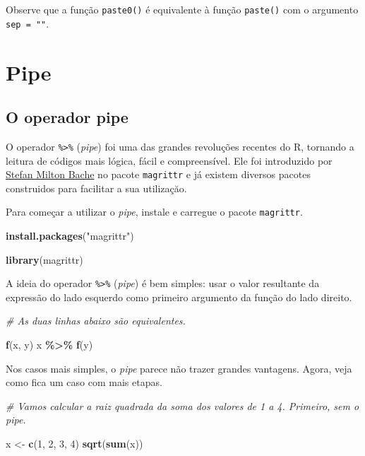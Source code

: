 \documentclass[
]{book}
\newenvironment{Shaded}{\begin{snugshade}}{\end{snugshade}}
\newcommand{\CommentTok}[1]{\textcolor[rgb]{0.56,0.35,0.01}{\textit{#1}}}
\newcommand{\DecValTok}[1]{\textcolor[rgb]{0.00,0.00,0.81}{#1}}
\newcommand{\KeywordTok}[1]{\textcolor[rgb]{0.13,0.29,0.53}{\textbf{#1}}}
\newcommand{\NormalTok}[1]{#1}
\newcommand{\OperatorTok}[1]{\textcolor[rgb]{0.81,0.36,0.00}{\textbf{#1}}}
\newcommand{\StringTok}[1]{\textcolor[rgb]{0.31,0.60,0.02}{#1}}
\begin{document}
Observe que a função \texttt{paste0()} é equivalente à função \texttt{paste()} com o argumento \texttt{sep\ =\ ""}.

\hypertarget{pipe}{%
\chapter{Pipe}\label{pipe}}

\hypertarget{o-operador-pipe}{%
\section{O operador pipe}\label{o-operador-pipe}}

O operador \texttt{\%\textgreater{}\%} (\emph{pipe}) foi uma das grandes revoluções recentes do R, tornando a leitura de códigos mais lógica, fácil e compreensível. Ele foi introduzido por \href{https://github.com/smbache}{Stefan Milton Bache} no pacote \texttt{magrittr} e já existem diversos pacotes construidos para facilitar a sua utilizaçăo.

Para começar a utilizar o \emph{pipe}, instale e carregue o pacote \texttt{magrittr}.

\begin{Shaded}
\begin{Highlighting}[]
\KeywordTok{install.packages}\NormalTok{(}\StringTok{"magrittr"}\NormalTok{)}

\KeywordTok{library}\NormalTok{(magrittr)}
\end{Highlighting}
\end{Shaded}

A ideia do operador \texttt{\%\textgreater{}\%} (\emph{pipe}) é bem simples: usar o valor resultante da expressão do lado esquerdo como primeiro argumento da função do lado direito.

\begin{Shaded}
\begin{Highlighting}[]
\CommentTok{\# As duas linhas abaixo são equivalentes.}

\KeywordTok{f}\NormalTok{(x, y)}
\NormalTok{x }\OperatorTok{\%>\%}\StringTok{ }\KeywordTok{f}\NormalTok{(y)}
\end{Highlighting}
\end{Shaded}

Nos casos mais simples, o \emph{pipe} parece não trazer grandes vantagens. Agora, veja como fica um caso com mais etapas.

\begin{Shaded}
\begin{Highlighting}[]
\CommentTok{\# Vamos calcular a raiz quadrada da soma dos valores de 1 a 4. Primeiro, sem o pipe.}

\NormalTok{x <{-}}\StringTok{ }\KeywordTok{c}\NormalTok{(}\DecValTok{1}\NormalTok{, }\DecValTok{2}\NormalTok{, }\DecValTok{3}\NormalTok{, }\DecValTok{4}\NormalTok{)}
\KeywordTok{sqrt}\NormalTok{(}\KeywordTok{sum}\NormalTok{(x))}
\end{Highlighting}
\end{Shaded}
\end{document}

